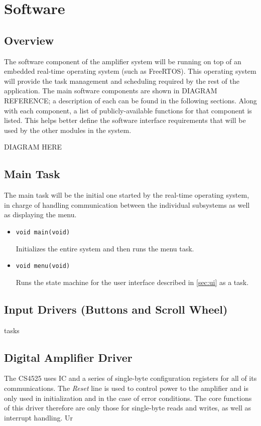 \chapter{Software}

\section{Overview}

The software component of the amplifier system will be running on top of an embedded real-time operating system (such as FreeRTOS). This operating system will provide the task management and scheduling required by the rest of the application. The main software components are shown in DIAGRAM REFERENCE; a description of each can be found in the following sections. Along with each component, a list of publicly-available functions for that component is listed. This helps better define the software interface requirements that will be used by the other modules in the system.

DIAGRAM HERE

\section{Main Task}

The main task will be the initial one started by the real-time operating system, in charge of handling communication between the individual subsystems as well as displaying the menu.

\begin{itemize}
\item \verb|void main(void)|

Initializes the entire system and then runs the menu task.

\item \verb|void menu(void)|

Runs the state machine for the user interface described in \autoref{sec:ui} as a task.
\end{itemize}

\section{Input Drivers (Buttons and Scroll Wheel)}

tasks

\section{Digital Amplifier Driver}
The CS4525 uses IC and a series of single-byte configuration registers for all of its communications. The \emph{Reset} line is used to control power to the amplifier and is only used in initialization and in the case of error conditions. The core functions of this driver therefore are only those for single-byte reads and writes, as well as interrupt handling. Ur

